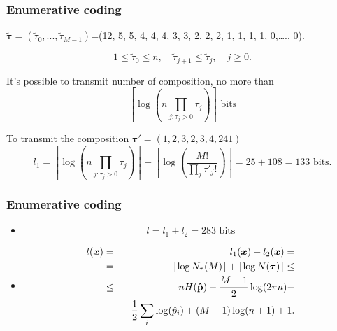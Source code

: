 \documentclass[14pt]{beamer}
\renewcommand{\vec}[1]{\ensuremath{\boldsymbol{#1}}}
\begin{document}
\begin{frame}
\frametitle{Enumerative coding}
\begin{itemize}    
\footnotesize {
    \item 
    $\vec { \tilde {\tau }} = (\tilde {\tau }_0 ,...,\tilde {\tau }_{M - 1} )$=(12, 5, 5, 4, 4, 4, 3, 3, 2, 2, 2, 1, 1, 1, 1, 0,\ldots ., 0).
    
    \item 
    \[
    1 \le \tilde {\tau }_0 \le n, \quad  \tilde {\tau} _{j+1} \le \tilde {\tau }_{j } , \quad j \ge 0.
    \]
    
    \item It's possible to transmit number of composition, no more than 
    \begin{equation}
    \label{eq3_28} \left \lceil \log \left( n\prod\limits_{j:\tau _j > 0} {\tau _j } \right ) \right\rceil \mbox{ bits} \end{equation}
    
    \item To transmit the composition $\vec \tau'=(1,2,3,2,3,4,241)$
    \begin{equation}
    \label{eq3_29} l_1 = \left\lceil {\log \left( {n\prod\limits_{j:\tau _j > 0} {\tau _j } } \right)} \right\rceil + \left\lceil {\log \left( {\frac{M!}{\prod\limits_j {{\tau }'_j !} }} \right)} \right\rceil = 25 + 108 = 133 \mbox{ bits}.
    \end{equation}
    
}    
\end{itemize}
\end{frame}


\begin{frame}
\frametitle{Enumerative coding}
\begin{itemize}    
    
    \item 
    \[
    l = l_1 + l_2 = 283 \mbox{ bits}
    \]
    
    \item 
    \begin{eqnarray*}
    l(\vec x) &=& l_1 (\vec x) + l_2 (\vec x) =\\
    &=& \left\lceil {\log N_\tau (M)} \right\rceil + \left\lceil {\log
    N(\vec \tau)} \right\rceil
    \le\\
    &\le& nH({\rm {\bf \hat {p}}}) - \frac{M - 1}{2}\log (2\pi n) -\\
    &&-\frac{1}{2}\sum\limits_i {\log (\hat {p}_i )} + (M - 1)\log (n +
    1) + 1.
    \end{eqnarray*}
    
    
\end{itemize}
\end{frame}
\end{document}
